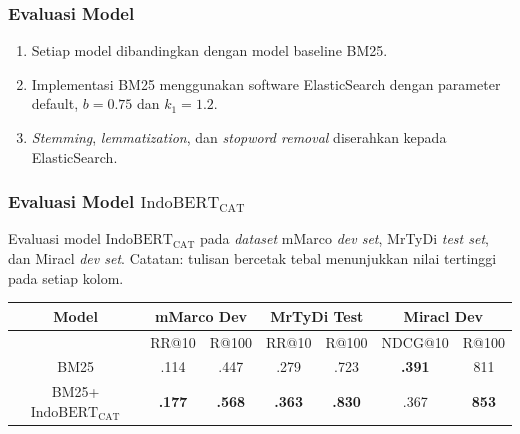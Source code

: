 \documentclass[10pt]{beamer}
\newcommand{\f}[1]{\textit{#1}}
\newcommand{\bo}[1]{\textbf{#1}}
\begin{document}
\begin{frame}
\frametitle{Evaluasi Model}
\begin{enumerate}
    \item Setiap model dibandingkan dengan model baseline BM25.
    \item Implementasi BM25 menggunakan software ElasticSearch dengan parameter default, $b = 0.75$ dan $k_1 = 1.2$.
    \item \f{Stemming}, \f{lemmatization}, dan \f{stopword removal} diserahkan kepada ElasticSearch.
\end{enumerate}
\end{frame}

\begin{frame}
    \frametitle{Evaluasi Model $\text{IndoBERT}_{\text{CAT}}$}
    Evaluasi model $\text{IndoBERT}_{\text{CAT}}$ pada \f{dataset} mMarco \f{dev set}, MrTyDi \f{test set}, dan Miracl \f{dev set}. Catatan: tulisan bercetak tebal menunjukkan nilai tertinggi pada setiap kolom.
    \begin{table}[!ht]
        \centering
        \footnotesize
        \label{tab:indobertcat-hasil}
        \begin{tabular}{|c|c|c|c|c|c|c|} \hline
            Model                             & \multicolumn{2}{c|}{mMarco Dev} &
            \multicolumn{2}{c|}{MrTyDi Test} & \multicolumn{2}{c|}{Miracl Dev}                                             \\ \hline
                                              & RR@10 & R@100 & RR@10 & R@100 & NDCG@10 & R@100 \\ \hline
            BM25                              & .114  & .447   & .279   & .723   & \bo{.391}    & 811 \\ \hline
            BM25+$\text{IndoBERT}_{\text{CAT}}$    & \bo{.177}  & \bo{.568}   & \bo{.363}   & \bo{.830}   & .367    & \bo{853} \\ \hline
        \end{tabular}
    \end{table}
\end{frame}
\end{document}
